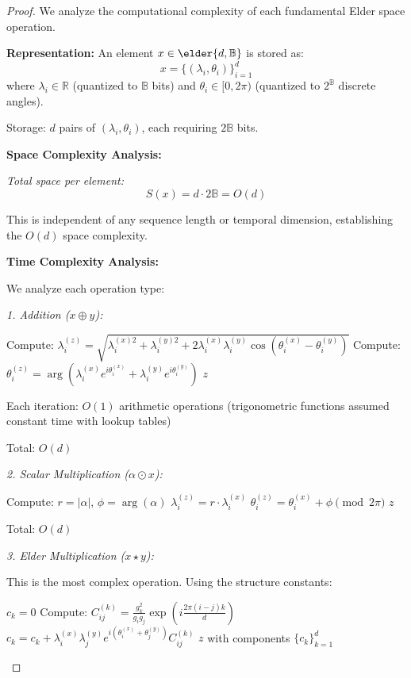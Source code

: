 \begin{proof}
We analyze the computational complexity of each fundamental Elder space operation.

\textbf{Representation:}
An element $x \in \elder{d, \mathbb{B}}$ is stored as:
$$x = \{(\lambda_i, \theta_i)\}_{i=1}^{d}$$
where $\lambda_i \in \mathbb{R}$ (quantized to $\mathbb{B}$ bits) and $\theta_i \in [0, 2\pi)$ (quantized to $2^{\mathbb{B}}$ discrete angles).

Storage: $d$ pairs of $(\lambda_i, \theta_i)$, each requiring $2\mathbb{B}$ bits.

\textbf{Space Complexity Analysis:}

\textit{Total space per element:}
$$S(x) = d \cdot 2\mathbb{B} = O(d)$$

This is independent of any sequence length or temporal dimension, establishing the $O(d)$ space complexity.

\textbf{Time Complexity Analysis:}

We analyze each operation type:

\textit{1. Addition ($x \oplus y$):}
\begin{algorithmic}[1]
        \State Compute: $\lambda_i^{(z)} = \sqrt{\lambda_i^{(x)2} + \lambda_i^{(y)2} + 2\lambda_i^{(x)}\lambda_i^{(y)}\cos(\theta_i^{(x)} - \theta_i^{(y)})}$
        \State Compute: $\theta_i^{(z)} = \arg(\lambda_i^{(x)}e^{i\theta_i^{(x)}} + \lambda_i^{(y)}e^{i\theta_i^{(y)}})$
    \EndFor
    \State \Return $z$
\EndProcedure
\end{algorithmic}

Each iteration: $O(1)$ arithmetic operations (trigonometric functions assumed constant time with lookup tables)

Total: $O(d)$

\textit{2. Scalar Multiplication ($\alpha \odot x$):}
\begin{algorithmic}[1]
    \State Compute: $r = |\alpha|$, $\phi = \arg(\alpha)$
        \State $\lambda_i^{(z)} = r \cdot \lambda_i^{(x)}$
        \State $\theta_i^{(z)} = \theta_i^{(x)} + \phi \pmod{2\pi}$
    \EndFor
    \State \Return $z$
\EndProcedure
\end{algorithmic}

Total: $O(d)$

\textit{3. Elder Multiplication ($x \star y$):}

This is the most complex operation. Using the structure constants:
\begin{algorithmic}[1]
        \State $c_k = 0$
                \State Compute: $C_{ij}^{(k)} = \frac{g_k^2}{g_i g_j} \exp(i\frac{2\pi(i-j)k}{d})$
                \State $c_k = c_k + \lambda_i^{(x)} \lambda_j^{(y)} e^{i(\theta_i^{(x)} + \theta_j^{(y)})} C_{ij}^{(k)}$
            \EndFor
        \EndFor
    \EndFor
    \State \Return $z$ with components $\{c_k\}_{k=1}^d$
\EndProcedure
\end{algorithmic}


\end{proof}
